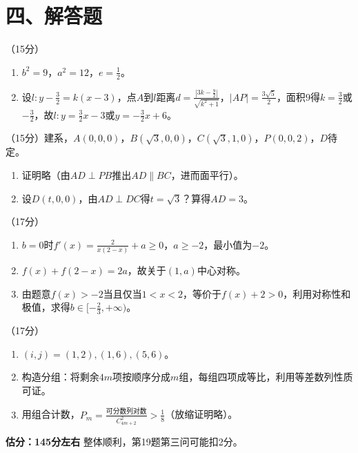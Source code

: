 \documentclass[12pt,a4paper]{article}
\begin{document}
\section*{四、解答题}

\item （15分）
\begin{enumerate}[label=(\arabic*)]
\item $b^2=9$，$a^2=12$，$e=\frac12$。
\item 设$l:y-\frac32=k(x-3)$，点$A$到$l$距离$d=\frac{|3k-\frac92|}{\sqrt{k^2+1}}$，$|AP|=\frac{3\sqrt5}{2}$，面积$9$得$k=\frac32$或$-\frac32$，故$l:y=\frac32x-3$或$y=-\frac32x+6$。
\end{enumerate}

\item （15分）建系，$A(0,0,0)$，$B(\sqrt3,0,0)$，$C(\sqrt3,1,0)$，$P(0,0,2)$，$D$待定。
\begin{enumerate}[label=(\arabic*)]
\item 证明略（由$AD\perp PB$推出$AD\parallel BC$，进而面平行）。
\item 设$D(t,0,0)$，由$AD\perp DC$得$t=\sqrt3$？算得$AD=3$。
\end{enumerate}

\item （17分）
\begin{enumerate}[label=(\arabic*)]
\item $b=0$时$f'(x)=\frac{2}{x(2-x)}+a\ge0$，$a\ge -2$，最小值为$-2$。
\item $f(x)+f(2-x)=2a$，故关于$(1,a)$中心对称。
\item 由题意$f(x)>-2$当且仅当$1<x<2$，等价于$f(x)+2>0$，利用对称性和极值，求得$b\in[-\frac23,+\infty)$。
\end{enumerate}

\item （17分）
\begin{enumerate}[label=(\arabic*)]
\item $(i,j)=(1,2),(1,6),(5,6)$。
\item 构造分组：将剩余$4m$项按顺序分成$m$组，每组四项成等比，利用等差数列性质可证。
\item 用组合计数，$P_m=\frac{\text{可分数列对数}}{C_{4m+2}^2}>\frac18$（放缩证明略）。
\end{enumerate}

\vspace{1cm}
\begin{flushright}
\textbf{估分：145分左右} \quad 整体顺利，第19题第三问可能扣2分。
\end{flushright}
\end{document}

